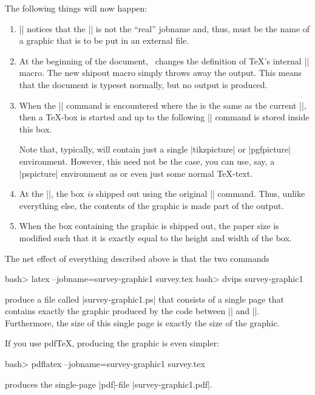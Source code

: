 The following things will now happen:
\begin{enumerate}
\item |\pgfrealjobname| notices that the |\jobname|
  is not the ``real'' jobname and, thus, must be the name of a graphic
  that is to be put in an external file.
\item At the beginning of the document, \pgfname\ changes the
  definition of \TeX's internal |\shipout| macro. The new shipout
  macro simply throws away the output. This means that the document is
  typeset normally, but no output is produced.
\item When the || command is
  encountered where the  is the same as the current
  |\jobname|, then a \TeX-box is started and  up to the
  following |\endpgfgraphicnamed| command is stored inside this box.

  Note that, typically,  will contain just a single
  |{tikzpicture}| or |{pgfpicture}| environment. However, this need
  not be the case, you can use, say, a |{pspicture}| environment as
   or even just some normal \TeX-text.  
\item At the |\endpgfgraphicnamed|, the box \emph{is} shipped out
  using the original |\shipout| command. Thus, unlike everything else,
  the contents of the graphic is made part of the output.
\item When the box containing the graphic is shipped out, the paper
  size is modified such that it is exactly equal to the height and width
  of the box. 
\end{enumerate}

The net effect of everything described above is that the two
commands
\begin{codeexample}[code only, tikz syntax=false]
bash> latex --jobname=survey-graphic1 survey.tex
bash> dvips survey-graphic1
\end{codeexample}
\noindent produce a file called |survey-graphic1.ps| that consists of a single
page that contains exactly the graphic produced by the code between
|| and
|\endpgfgraphicnamed|. Furthermore, the size of this single page is
exactly the size of the graphic.

If you use pdf\TeX, producing the graphic is even simpler:
\begin{codeexample}[code only, tikz syntax=false]
bash> pdflatex --jobname=survey-graphic1 survey.tex
\end{codeexample}
\noindent produces the single-page |pdf|-file |survey-graphic1.pdf|.

